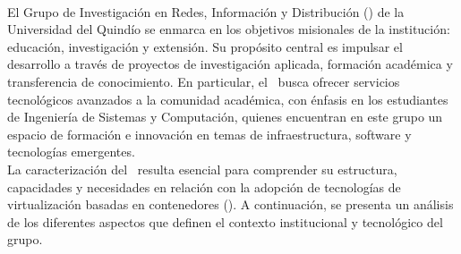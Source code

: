 \label{cap:caracterizacionGRID}
\mbox{}\\
El Grupo de Investigación en Redes, Información y Distribución (\GRID) de la Universidad del Quindío se enmarca en los objetivos misionales de la institución: educación, investigación y extensión. Su propósito central es impulsar el desarrollo a través de proyectos de investigación aplicada, formación académica y transferencia de conocimiento. En particular, el \GRID\ busca ofrecer servicios tecnológicos avanzados a la comunidad académica, con énfasis en los estudiantes de Ingeniería de Sistemas y Computación, quienes encuentran en este grupo un espacio de formación e innovación en temas de infraestructura, software y tecnologías emergentes.\\
La caracterización del \GRID\ resulta esencial para comprender su estructura, capacidades y necesidades en relación con la adopción de tecnologías de virtualización basadas en contenedores (\VBC). A continuación, se presenta un análisis de los diferentes aspectos que definen el contexto institucional y tecnológico del grupo.

